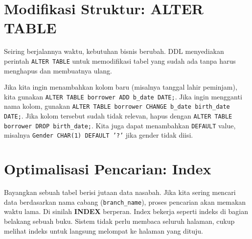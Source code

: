 \documentclass[11pt,a4paper]{article}
\begin{document}
\section{Modifikasi Struktur: ALTER TABLE}

Seiring berjalannya waktu, kebutuhan bisnis berubah. DDL menyediakan perintah \texttt{ALTER TABLE} untuk memodifikasi tabel yang sudah ada tanpa harus menghapus dan membuatnya ulang.

Jika kita ingin menambahkan kolom baru (misalnya tanggal lahir peminjam), kita gunakan \texttt{ALTER TABLE borrower ADD b\_date DATE;}. Jika ingin mengganti nama kolom, gunakan \texttt{ALTER TABLE borrower CHANGE b\_date birth\_date DATE;}. Jika kolom tersebut sudah tidak relevan, hapus dengan \texttt{ALTER TABLE borrower DROP birth\_date;}. Kita juga dapat menambahkan \texttt{DEFAULT} value, misalnya \texttt{Gender CHAR(1) DEFAULT '?'} jika gender tidak diisi.

\section{Optimalisasi Pencarian: Index}

Bayangkan sebuah tabel berisi jutaan data nasabah. Jika kita sering mencari data berdasarkan nama cabang (\texttt{branch\_name}), proses pencarian akan memakan waktu lama. Di sinilah \textbf{INDEX} berperan. Index bekerja seperti indeks di bagian belakang sebuah buku. Sistem tidak perlu membaca seluruh halaman, cukup melihat indeks untuk langsung melompat ke halaman yang dituju.
\end{document}
